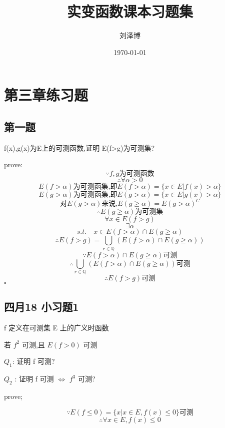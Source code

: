 \documentclass[a4paper]{article}
\title{实变函数课本习题集}
\author{刘泽博}
\date{\today}
\begin{document}
    \maketitle
    \tableofcontents
    \section{第三章练习题}    
    \subsection{第一题}

    f(x),g(x)为E上的可测函数,证明 E(f>g)为可测集?

    prove:
    \[\because f,g\text{为可测函数}\]
    \[\therefore \forall \alpha >0\]
    \[E(f>\alpha)\text{为可测函集,即}E(f>\alpha)=\{x\in E | f(x)>\alpha\}\]
    \[E(g>\alpha)\text{为可测函集,即}E(g>\alpha)=\{x\in E | g(x)>\alpha\}\]
    \[\text{对}E(g>\alpha)\text{来说,}E(g\ge\alpha)=E(g>\alpha)^C\]
    \[\therefore E(g\ge\alpha)\text{为可测集}\]
    \[\forall x \in E(f>g)\]
    \[\exists \alpha\]
    \[s.t. \quad x\in E(f>\alpha) \cap E(g \ge \alpha)\]
    \[\therefore E(f>g)=\bigcup_{r\in \mathbb{Q}}(E(f>\alpha)\cap E(g\ge \alpha))\]
    \[\because E(f>\alpha)\cap E(g\ge\alpha)\text{可测}\]
    \[\therefore \bigcup_{r\in \mathbb{Q}}(E(f>\alpha)\cap E(g\ge \alpha))\text{可测}\]
    \[\therefore E(f>g)\text{可测}\]
    \hfill $\square$

    \subsection{四月18 小习题1}
    
    f 定义在可测集 E 上的广义时函数

    若 $f^2$ 可测,且 $E(f>0)$ 可测

    $Q_1$: 证明 f 可测?

    $Q_2$ : 证明 f 可测 $\Leftrightarrow$ $f^3$ 可测?

    prove;

    \[\because E(f \le 0)=\{x|x\in E,f(x) \le 0\}\text{可测}\]
    \[\therefore \forall x \in E,f(x)\le 0\]
\end{document}
